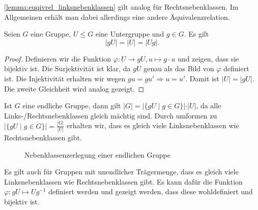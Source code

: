 \begin{remark}
    \cref{lemma:euqivrel_linksnebenklassen} gilt analog für Rechtsnebenklassen. Im Allgemeinen erhält man dabei allerdings eine andere Äquivalenzrelation.
\end{remark}

\begin{lemma}
    Seien $G$ eine Gruppe, $U \le G$ eine Untergruppe und $g \in G$. Es gilt $$\vert gU \vert = \vert U \vert = \vert Ug \vert.$$
\end{lemma}
\begin{proof}
    Definieren wir die Funktion $\varphi: U \to gU, u \mapsto g\cdot u$ und zeigen, dass sie bijektiv ist. Die Surjektivität ist klar, da $gU$ genau als das Bild von $\varphi$ definiert ist. Die Injektivität erhalten wir wegen $gu = gu' \Rightarrow u = u'$. Damit ist $\vert U \vert = \vert gU \vert$. Die zweite Gleichheit wird analog gezeigt.
\end{proof}

\begin{remark}\label{rem:nebenklassenzerlegung_endlich}
    Ist $G$ eine endliche Gruppe, dann gilt $\vert G \vert = \vert \{gU \mid g \in G\} \vert \cdot \vert U \vert$, da alle Links-/Rechtsnebenklassen gleich mächtig sind. Durch umformen zu $\vert \{gU \mid g \in G\} \vert = \frac{\vert G \vert}{\vert U \vert}$ erhalten wir, dass es gleich viele Linksnebenklassen wie Rechtsnebenklassen gibt.

    \begin{figure}[H]
        \centering
        \caption{Nebenklassenzerlegung einer endlichen Gruppe}
    \end{figure}
\end{remark}

\begin{remark}
    Es gilt auch für Gruppen mit unendlicher Trägermenge, dass es gleich viele Linksnebenklassen wie Rechtsnebenklassen gibt. Es kann dafür die Funktion $\varphi: gU \mapsto Ug^{-1}$ definiert werden und gezeigt werden, dass diese wohldefiniert und bijektiv ist.
\end{remark}


